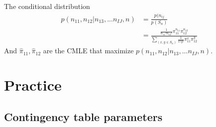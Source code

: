 The conditional distribution
\begin{align*}
	p(n_{11}, n_{12}|n_{13}, ...n_{IJ}, n) &= \frac{p(n_{ij}}{p(S_n)}\\
	&= \frac{\frac{1}{n_{11}! n_{12}! } \pi_{11}^{n_{11}} \pi_{12}^{n_{12}}}{\sum_{(x, y \in S_n)} \frac{1}{x! y!} \pi_{11}^x \pi_{12}^y}
\end{align*}
And $\hat{\pi}_{11}, \hat{\pi}_{12}$ are the CMLE that maximize $p(n_{11}, n_{12}|n_{13}, ...n_{IJ}, n)$.



\section{Practice}
\subsection{Contingency table parameters}
